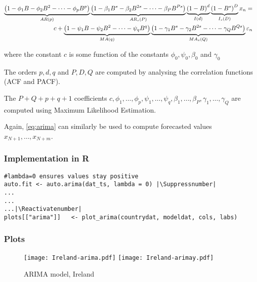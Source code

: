 \begin{align}\label{eq:arima}
\underbrace{\left(1-\phi_1 B-\phi_2B^2-\dots-\phi_p B^p\right)}_{AR(p)}
\underbrace{\left(1-\beta_1 B^s-\beta_2B^{2s}-\dots-\beta_P B^{Ps}\right)}_{AR_s(P)} 
\underbrace{\left(1-B\right)^d}_{I(d)}\underbrace{\left(1-B^s\right)^D}_{I_s(D)}   x_n = \nonumber \\
 c+
\underbrace{\left(1-\psi_1 B-\psi_2B^2-\dots-\psi_q B^q\right)}_{MA(q)}
\underbrace{\left(1-\gamma_1 B^s-\gamma_2B^{2s}-\dots-\gamma_Q B^{Qs}\right)}_{MA_s(Q)} \varepsilon_n
\end{align}

where the constant $c$ is some function of the constants $\phi_0,\psi_0,\beta_0$ and $\gamma_0$ 

The orders $p, d, q$ and $P,D,Q$ are computed by analysing the correlation functions (ACF and PACF).

The $P+Q+p + q + 1$ coefficients $c, \phi_1, \dots , \phi_p, \psi_1,\dots , \psi_q, \beta_1,\dots,\beta_P,\gamma_1,\dots,\gamma_Q$ are computed using Maximum Likelihood Estimation.

Again, \ref{eq:arima} can similarly be used to compute forecasted values $x_{N+1},\dots,x_{N+m}$.

\subsubsection{Implementation in R}

\begin{lstlisting}[breaklines = true, escapeinside=||, tabsize = 4, caption = {Algorithm for ARIMA Model}]
#lambda=0 ensures values stay positive
auto.fit <- auto.arima(dat_ts, lambda = 0) |\Suppressnumber|
...
...
...|\Reactivatenumber|
plots[["arima"]]   <- plot_arima(countrydat, modeldat, cols, labs)
\end{lstlisting}

\subsubsection{Plots}

\begin{figure}[H]
  \texttt{[image: Ireland-arima.pdf]} \label{fig:ireland-arima}
\endminipage\hfill
{}
  \texttt{[image: Ireland-arimay.pdf]} \label{fig:ireland-arimay}
\endminipage
\caption{ARIMA model, Ireland}
\end{figure}

